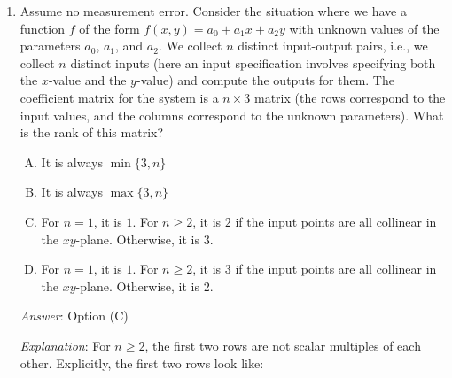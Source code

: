 \documentclass[10pt]{amsart}
\begin{document}
\begin{enumerate}
  \begin{enumerate}[(A)]
  \item It is always $m + 1$
  \item It is always $n$
  \item It is always $\min \{ m + 1, n \}$
  \item It is always $\max \{ m + 1, n \}$
  \end{enumerate}

  {\em Answer}: Option (C)

  {\em Explanation}: The rank can be at {\em most} $\min \{m + 1,n \}$
  because it is at most the minimum of the number of rows and the
  number of columns. See Section 3.1 of the lecture notes on
  ``hypothesis testing, rank, and overdetermination'' but note that
  the roles of $m$ and $n$ are interchanged there relative to this
  question.
  
  {\em Performance review}: 24 out of 25 people got this. 1 chose (D).

\item Assume no measurement error. Consider the situation where we
  have a function $f$ of the form $f(x,y) = a_0 + a_1x + a_2y$ with
  unknown values of the parameters $a_0$, $a_1$, and $a_2$. We collect
  $n$ distinct input-output pairs, i.e., we collect $n$ distinct
  inputs (here an input specification involves specifying both the
  $x$-value and the $y$-value) and compute the outputs for them. The
  coefficient matrix for the system is a $n \times 3$ matrix (the rows
  correspond to the input values, and the columns correspond to the
  unknown parameters). What is the rank of this matrix?

  \begin{enumerate}[(A)]
  \item It is always $\min \{ 3,n \}$
  \item It is always $\max \{ 3,n \}$
  \item For $n = 1$, it is $1$. For $n \ge 2$, it is $2$ if the input
    points are all collinear in the $xy$-plane. Otherwise, it is $3$.
  \item For $n = 1$, it is $1$. For $n \ge 2$, it is $3$ if the input
    points are all collinear in the $xy$-plane. Otherwise, it is $2$.
  \end{enumerate}

  {\em Answer}: Option (C)

  {\em Explanation}: For $n \ge 2$, the first two rows are not scalar
  multiples of each other. Explicitly, the first two rows look like:


\end{enumerate}
\end{document}
